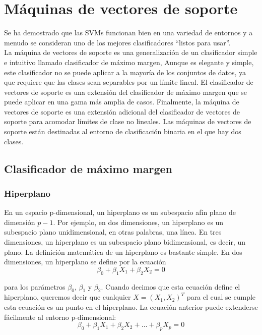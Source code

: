 \chapter{Máquinas de vectores de soporte}\label{Chapter8} 

Se ha demostrado que las SVMs funcionan bien en una variedad de entornos y a menudo se consideran uno de los mejores clasificadores ``listos para usar''. \\

La máquina de vectores de soporte es una generalización de un clasificador simple e intuitivo llamado clasificador de máximo margen, Aunque es elegante y simple,  este clasificador no se puede aplicar a la mayoría de los conjuntos de datos, ya que requiere que las clases sean separables por un límite lineal. El clasificador de vectores de soporte es una extensión del clasificador de máximo margen que se puede aplicar en una gama más amplia de casos. Finalmente, la máquina de vectores de soporte es una extensión adicional del clasificador de vectores de soporte para acomodar límites de clase no lineales. Las máquinas de vectores de soporte están destinadas al entorno de clasificación binaria en el que hay dos clases. 

\section{Clasificador de máximo margen}

\subsection{Hiperplano}

En un espacio p-dimensional, un hiperplano es un subespacio afín plano de dimensión $p - 1$. Por ejemplo, en dos dimensiones, un hiperplano es un subespacio plano unidimensional, en otras palabras, una línea. En tres dimensiones, un hiperplano es un subespacio plano bidimensional, es decir, un plano. La definición matemática de un hiperplano es bastante simple. En dos dimensiones, un hiperplano se define por la ecuación
\begin{equation}
\beta_0 + \beta_1 X_1 + \beta_2 X_2 = 0
\label{eq:9.1}
\end{equation}

para los parámetros $\beta_0$, $\beta_1$ y $\beta_2$. Cuando decimos que esta ecuación define el hiperplano, queremos decir que cualquier $X = (X_1, X_2)^T$ para el cual se cumple esta ecuación es un punto en el hiperplano. La ecuación anterior puede extenderse fácilmente al entorno p-dimensional:
\begin{equation}
\beta_0 + \beta_1 X_1 + \beta_2 X_2 + \ldots + \beta_p X_p = 0
\label{eq:9.2}
\end{equation}

